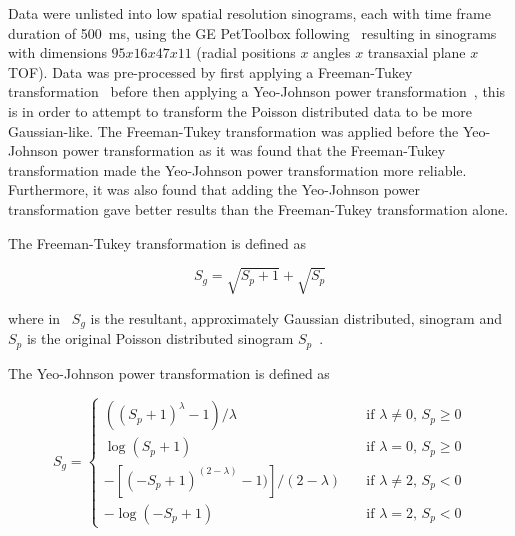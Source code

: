                 Data were unlisted into low spatial resolution sinograms, each with time frame duration of \SI{500}{\milli\second}, using the \gls{GE} PetToolbox following~\parencite{Bertolli2018Data-DrivenTomography} resulting in sinograms with dimensions $95 x 16 x 47 x 11$ (radial positions $x$ angles $x$ transaxial plane $x$ \gls{TOF}). Data was pre-processed by first applying a Freeman-Tukey transformation~\parencite{Freeman1950TransformationsRoot} before then applying a Yeo-Johnson power transformation~\parencite{Yeo2000ASymmetry}, this is in order to attempt to transform the Poisson distributed data to be more Gaussian-like. The Freeman-Tukey transformation was applied before the Yeo-Johnson power transformation as it was found that the Freeman-Tukey transformation made the Yeo-Johnson power transformation more reliable. Furthermore, it was also found that adding the Yeo-Johnson power transformation gave better results than the Freeman-Tukey transformation alone.
                
                The Freeman-Tukey transformation is defined as

                \begin{equation} \label{eq:pca_data_driven_surrogate_signal_extraction_methods_for_dynamic_pet_methods_freeman_tukey}
                    S_g = \sqrt{S_p + 1} + \sqrt{S_p}
                \end{equation}

                \noindent where in~ $S_g$ is the resultant, approximately Gaussian distributed, sinogram and $S_p$ is the original Poisson distributed sinogram $S_p$~\parencite{Freeman1950TransformationsRoot}.
                
                The Yeo-Johnson power transformation is defined as

                \begin{equation} \label{eq:pca_data_driven_surrogate_signal_extraction_methods_for_dynamic_pet_methods_yeo_johnson}
                    S_g =   \begin{cases}
                                ((S_p + 1)^\lambda - 1) / \lambda                   & \quad \text{if } \lambda \neq 0 \text{, } S_p \geq 0 \\
                                \log(S_p + 1)                                       & \quad \text{if } \lambda = 0 \text{, } S_p \geq 0    \\
                                -[(-S_p + 1)^{(2 - \lambda)} - 1)] / (2 - \lambda)  & \quad \text{if } \lambda \neq 2 \text{, } S_p < 0    \\
                                -\log(-S_p + 1)                                     & \quad \text{if } \lambda = 2 \text{, } S_p < 0
                            \end{cases}
                \end{equation}

